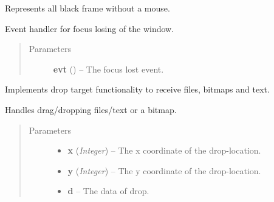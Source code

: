 \documentclass[letterpaper,10pt,english]{sphinxmanual}
\begin{document}
\begin{fulllineitems}
\label{graphicaldesign:graphicaldesign.BlackOverlay}
Represents all black frame without a mouse.

\begin{fulllineitems}
\label{graphicaldesign:graphicaldesign.BlackOverlay.OnFocusLost}
Event handler for focus losing of the window.
\begin{quote}\begin{description}
\item[{Parameters}] \leavevmode
\textbf{evt} () -- The focus lost event.

\end{description}\end{quote}

\end{fulllineitems}


\end{fulllineitems}


\begin{fulllineitems}
\label{graphicaldesign:graphicaldesign.DropTarget}
Implements drop target functionality to receive files, bitmaps and text.

\begin{fulllineitems}
\label{graphicaldesign:graphicaldesign.DropTarget.OnData}
Handles drag/dropping files/text or a bitmap.
\begin{quote}\begin{description}
\item[{Parameters}] \leavevmode\begin{itemize}
\item {} 
\textbf{x} (\emph{Integer}) -- The x coordinate of the drop-location.

\item {} 
\textbf{y} (\emph{Integer}) -- The y coordinate of the drop-location.

\item {} 
\textbf{d} -- The data of drop.

\end{itemize}

\end{description}\end{quote}

\end{fulllineitems}


\end{fulllineitems}
\end{document}
